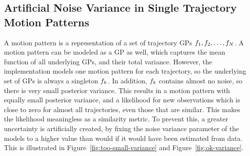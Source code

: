 \subsection{Artificial Noise Variance in Single Trajectory Motion Patterns}
A motion pattern is a representation of a set of trajectory GPs
$f_1, f_2, \dots, f_N$. A motion pattern can
be modeled as a GP as well, which captures the mean function of all
underlying GPs, and their total variance. However, the implementation
models one motion pattern for each trajectory, so the underlying set of 
GPs is always a singleton ${f_k}$. In addition, $f_k$
contains almost no noise, so there is very small posterior variance.
This results in a motion pattern with equally small posterior
variance, and a likelihood for new observations which is close to zero
for almost all trajectories, even those that are similar. This makes
the likelihood meaningless as a similarity metric. To prevent this, a
greater uncertainty is artificially created, by fixing the noise variance
parameter of the models to a higher value than would if it
would have been estimated from data. This is illustrated in
Figure~\ref{fig:too-small-variance} and Figure~\ref{fig:ok-variance}.

